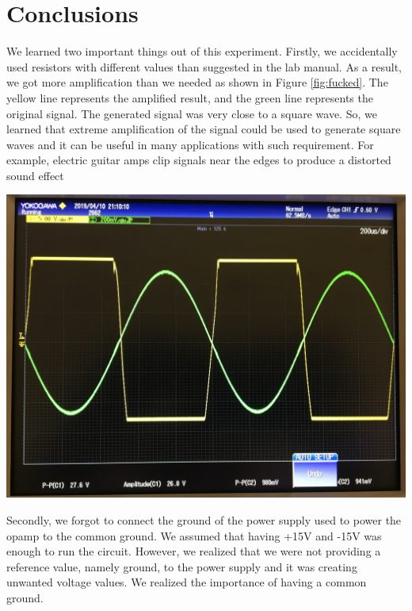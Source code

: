 \documentclass[journal]{IEEEtran}
\begin{document}
\section{Conclusions}
\noindent We learned two important things out of this experiment. Firstly, we accidentally used resistors with different values than suggested in the lab manual. As a result, we got more amplification than we needed as shown in Figure \ref{fig:fucked}. The yellow line represents the amplified result, and the green line represents the original signal. The generated signal was very close to a square wave. So, we learned that extreme amplification of the signal could be used to generate square waves and it can be useful in many applications with such requirement. For example, electric guitar amps clip signals near the edges to produce a distorted sound effect 

\begingroup
    \centering
    \medskip
    \includegraphics[width=\columnwidth]{images/lab7_fucked.jpg}
    \label{fig:fucked}
    \medskip
\endgroup

\noindent Secondly, we forgot to connect the ground of the power supply used to power the opamp to the common ground. We assumed that having +15V and -15V was enough to run the circuit. However, we realized that we were not providing a reference value, namely ground, to the power supply and it was creating unwanted voltage values. We realized the importance of having a common ground. \\
\end{document}
